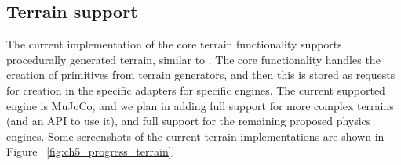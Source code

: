 \figProgressSensors

\subsection*{Terrain support}

The current implementation of the core terrain functionality supports procedurally generated
terrain, similar to \cite{DeepmindEmergenceLocomotion}. The core functionality handles 
the creation of primitives from terrain generators, and then this is stored as 
requests for creation in the specific adapters for specific engines. The current 
supported engine is MuJoCo, and we plan in adding full support for more complex 
terrains (and an API to use it), and full support for the remaining proposed physics 
engines. Some screenshots of the current terrain implementations are shown
in Figure ~\ref{fig:ch5_progress_terrain}.

\figProgressTerrains


\tableAgentFormatsSupport
\tableBackendsSupport